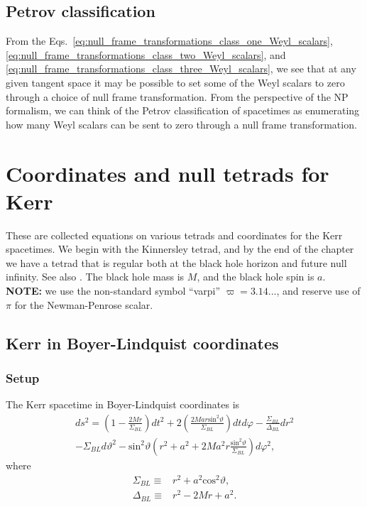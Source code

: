 \documentclass[12pt]{report}
\begin{document}
\section{Petrov classification}
	From the 
Eqs.~\eqref{eq:null_frame_transformations_class_one_Weyl_scalars},
\eqref{eq:null_frame_transformations_class_two_Weyl_scalars},
and \eqref{eq:null_frame_transformations_class_three_Weyl_scalars}, we see
that at any given tangent space it may be possible to set some of the
Weyl scalars to zero through a choice of null frame transformation. From
the perspective of the NP formalism, 
we can think of the  Petrov classification of spacetimes as enumerating 
how many Weyl scalars can be sent to zero through a null
frame transformation.
\chapter{Coordinates and null tetrads for Kerr}
These are collected equations on various tetrads and coordinates
for the Kerr spacetimes.
We begin with the Kinnersley tetrad, and by the end of the chapter
we have a tetrad that is regular both at the black hole horizon and
future null infinity. See also \cite{Ripley:2020xby}.
The black hole mass is $M$, and the black hole spin is $a$.
{\bf NOTE:} we use the non-standard symbol ``varpi'' $\varpi=3.14...$,
and reserve use of $\pi$ for the Newman-Penrose scalar.
\section{Kerr in Boyer-Lindquist coordinates}
\subsection{Setup}
	The Kerr spacetime in Boyer-Lindquist coordinates is
\begin{align}
\label{eq:Kerr_BL_coords}
	ds^2
	=
	\left(1-\frac{2Mr}{\Sigma_{BL}}\right)dt^2
+	2\left(\frac{2Mar\mathrm{sin}^2\vartheta}{\Sigma_{BL}}\right)dtd\varphi
-	\frac{\Sigma_{BL}}{\Delta_{BL}}dr^2
	\nonumber \\
-	\Sigma_{BL}d\vartheta^2
-	\mathrm{sin}^2\vartheta\left(
		r^2+a^2+2Ma^2r\frac{\mathrm{sin}^2\vartheta}{\Sigma_{BL}}
	\right)
	d\varphi^2
	,
\end{align}
	where
\begin{subequations}
\begin{align}
	\Sigma_{BL}\equiv & r^2+a^2\mathrm{cos}^2\vartheta 
	, \\
	\Delta_{BL}\equiv & r^2-2Mr+a^2
	.
\end{align}
\end{subequations}
\end{document}
